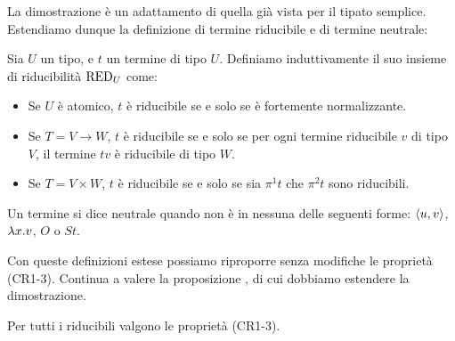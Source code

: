 \documentclass[]{marticle}
\begin{document}
La dimostrazione \`e un adattamento di quella gi\`a vista per il tipato
semplice. Estendiamo dunque la definizione di termine riducibile e di termine
neutrale:
\begin{block}[Definizione]
    Sia $U$ un tipo, e $t$ un termine di tipo $U$. Definiamo induttivamente il
    suo insieme di riducibilit\`a $\text{RED}_{U}$ come:
    \begin{itemize}
        \item Se $U$ \`e atomico, $t$ \`e riducibile se e solo se \`e fortemente
            normalizzante.
        \item Se $T = V \rightarrow W$, $t$ \`e riducibile se e solo se per ogni
            termine riducibile $v$ di tipo $V$, il termine $tv$ \`e riducibile
            di tipo $W$.
        \item Se $T = V \times W$, $t$ \`e riducibile se e solo se sia $\pi^1
            t$ che $\pi^2 t$ sono riducibili.
    \end{itemize}
\end{block}

\begin{block}[Definiizone]
    Un termine si dice neutrale quando non \`e in nessuna delle seguenti forme:
    $\langle u,v \rangle$, $\lambda x. v$, $O$ o $S t$.
\end{block}

Con queste definizioni estese possiamo riproporre senza modifiche le propriet\`a
(CR1-3). Continua a valere la proposizione , di cui dobbiamo
estendere la dimostrazione.

\begin{block}[Proposizione]
    Per tutti i riducibili valgono le propriet\`a (CR1-3).
\end{block}
\end{document}
